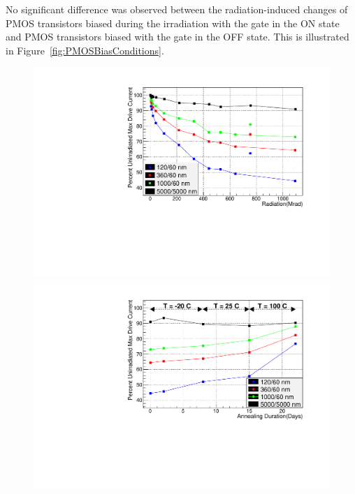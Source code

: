 No significant difference was observed between the radiation-induced changes of PMOS transistors biased during the irradiation with the gate in the ON state and PMOS transistors biased with the gate in the OFF state.  This is illustrated in Figure~\ref{fig:PMOSBiasConditions}.

\begin{figure}
\begin{minipage}[b]{0.5\textwidth}
	\centering
	\includegraphics[width=\linewidth]{Comparing_MaxCurrentDrive_PMOS_paper.pdf}
\end{minipage}
\hspace{0.5cm}
\begin{minipage}[b]{0.5\textwidth}
	\centering
	\includegraphics[width=\linewidth]{Comparing_MaxCurDrive_Anneal_PMOS_paper.pdf}

\end{minipage}
\end{figure}
